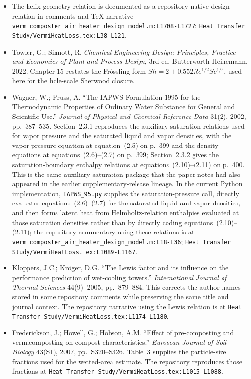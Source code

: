\documentclass[11pt]{article}
\newcommand{\srcref}[1]{\nolinkurl{#1}}
\newcommand{\filepath}[1]{\nolinkurl{#1}}
\begin{document}
\begin{itemize}[leftmargin=*]
\item [R7] The helix geometry relation is documented as a repository-native design relation in comments and TeX narrative \srcref{vermicomposter_air_heater_design_model.m:L1708-L1727}; \srcref{Heat Transfer Study/VermiHeatLoss.tex:L38-L121}.
\item [R8] Towler, G.; Sinnott, R. \emph{Chemical Engineering Design: Principles, Practice and Economics of Plant and Process Design}, 3rd ed. Butterworth-Heinemann, 2022. Chapter 15 restates the Fr\"ossling form \(Sh=2+0.552Re^{1/2}Sc^{1/3}\), used here for the hole-scale Sherwood closure.
\item [R9] Wagner, W.; Pruss, A. ``The IAPWS Formulation 1995 for the Thermodynamic Properties of Ordinary Water Substance for General and Scientific Use.'' \emph{Journal of Physical and Chemical Reference Data} 31(2), 2002, pp.~387--535. Section~2.3.1 reproduces the auxiliary saturation relations used for vapor pressure and the saturated liquid and vapor densities, with the vapor-pressure equation at equation~(2.5) on p.~399 and the density equations at equations~(2.6)--(2.7) on p.~399; Section~2.3.2 gives the saturation-boundary enthalpy relations at equations~(2.10)--(2.11) on p.~400. This is the same auxiliary saturation package that the paper notes had also appeared in the earlier supplementary-release lineage. In the current Python implementation, \filepath{IAPWS_95.py} supplies the saturation-pressure call, directly evaluates equations~(2.6)--(2.7) for the saturated liquid and vapor densities, and then forms latent heat from Helmholtz-relation enthalpies evaluated at those saturation densities rather than by directly coding equations~(2.10)--(2.11); the repository commentary using these relations is at \srcref{vermicomposter_air_heater_design_model.m:L18-L36}; \srcref{Heat Transfer Study/VermiHeatLoss.tex:L1089-L1167}.
\item [R10] Kloppers, J.C.; Kr\"{o}ger, D.G. ``The Lewis factor and its influence on the performance prediction of wet-cooling towers.'' \emph{International Journal of Thermal Sciences} 44(9), 2005, pp.~879--884. This corrects the author names stored in some repository comments while preserving the same title and journal context. The repository narrative using the Lewis relation is at \srcref{Heat Transfer Study/VermiHeatLoss.tex:L1174-L1180}.
\item [R11] Frederickson, J.; Howell, G.; Hobson, A.M. ``Effect of pre-composting and vermicomposting on compost characteristics.'' \emph{European Journal of Soil Biology} 43(S1), 2007, pp.~S320--S326. Table~3 supplies the particle-size fractions used for the wetted-area estimate. The repository reproduces those fractions at \srcref{Heat Transfer Study/VermiHeatLoss.tex:L1015-L1088}.

\end{itemize}
\end{document}
